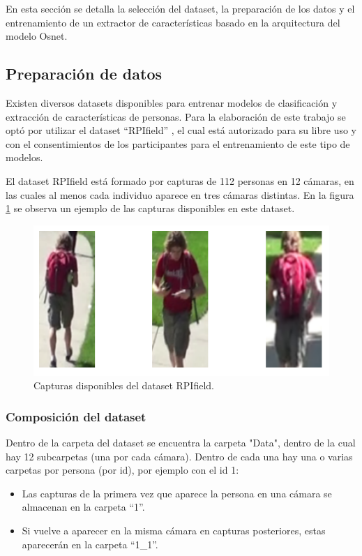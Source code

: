 En esta sección se detalla la selección del dataset, la preparación de los datos y el entrenamiento de un extractor de características basado en la arquitectura del modelo Osnet.

\subsection{Preparación de datos}

Existen diversos datasets disponibles \citep{DATASETS} para entrenar modelos de clasificación y extracción de características de personas. Para la elaboración de este trabajo se optó por utilizar el dataset ``RPIfield'' \citep{RPIfield}, el cual está autorizado para su libre uso y con el consentimientos de los participantes para el entrenamiento de este tipo de modelos.

El dataset RPIfield está formado por capturas de 112 personas en 12 cámaras, en las cuales al menos cada individuo aparece en tres cámaras distintas. En la figura \ref{fig:capturasDataset} se observa un ejemplo de las capturas disponibles en este dataset.

\begin{figure}[ht]
	\centering
	\includegraphics[scale=.70]{./Figures/capturasDataset.png}
	\caption{Capturas disponibles del dataset RPIfield.}
	\label{fig:capturasDataset}
\end{figure}

\subsubsection{Composición del dataset}

Dentro de la carpeta del dataset se encuentra la carpeta "Data", dentro de la cual hay 12 subcarpetas (una por cada cámara). Dentro de cada una hay una o varias carpetas por persona (por id), por ejemplo con el id 1:
\begin{itemize}
\item Las capturas de la primera vez que aparece la persona en una cámara se almacenan en la carpeta ``1''.
\item Si vuelve a aparecer en la misma cámara en capturas posteriores, estas aparecerán en la carpeta ``1\_1''.
\end{itemize}

